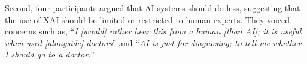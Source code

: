 Second, four participants argued that AI systems should do less, suggesting that the use of XAI should be limited or restricted to human experts. They voiced concerns such as, ``{\it I [would] rather hear this from a human [than AI]; it is useful when used [alongside] doctors}'' and ``{\it AI is just for diagnosing; to tell me whether I should go to a doctor.}''